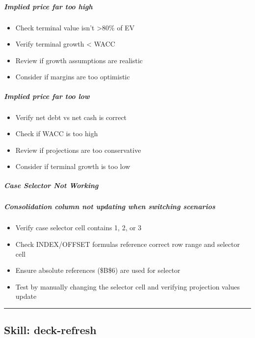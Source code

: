 \documentclass[11pt]{article}
\begin{document}
\subparagraph{Implied price far too high}\mbox{}\par
\begin{itemize}[leftmargin=*,itemsep=2pt,topsep=2pt]
\item {} Check terminal value isn't >80\% of EV
\item {} Verify terminal growth < WACC
\item {} Review if growth assumptions are realistic
\item {} Consider if margins are too optimistic
\end{itemize}

\subparagraph{Implied price far too low}\mbox{}\par
\begin{itemize}[leftmargin=*,itemsep=2pt,topsep=2pt]
\item {} Verify net debt vs net cash is correct
\item {} Check if WACC is too high
\item {} Review if projections are too conservative
\item {} Consider if terminal growth is too low
\end{itemize}

\subparagraph{Case Selector Not Working}\mbox{}\par

\subparagraph{Consolidation column not updating when switching scenarios}\mbox{}\par
\begin{itemize}[leftmargin=*,itemsep=2pt,topsep=2pt]
\item {} Verify case selector cell contains 1, 2, or 3
\item {} Check INDEX/OFFSET formulas reference correct row range and selector cell
\item {} Ensure absolute references (\$B\$6) are used for selector
\item {} Test by manually changing the selector cell and verifying projection values update
\end{itemize}

\vspace{0.8em}\hrule\vspace{0.8em}

\subsection{Skill: deck-refresh}\label{file:skills-deck-refresh-SKILL-md}
\end{document}
